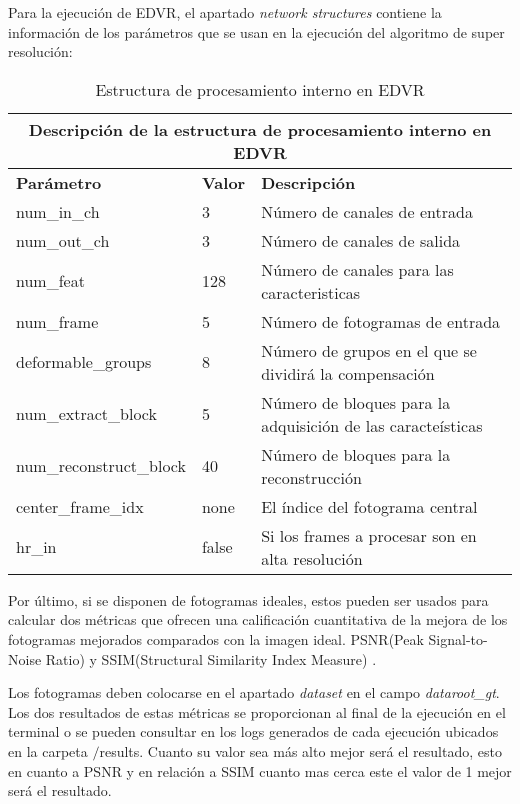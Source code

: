 Para la ejecución de EDVR, el apartado \emph{network structures} contiene la información de los parámetros que se usan en la ejecución del algoritmo de super resolución:

\begin{table}[h]
\begin{tabular}{ |p{5cm}||p{1cm}|p{6cm}|  }
 \hline
 \multicolumn{3}{|c|}{Descripción de la estructura de procesamiento interno en EDVR} \\
 \hline
 \textbf{Parámetro}&  \textbf{Valor}&  \textbf{Descripción} \\
 \hline
  \hline
            num\_in\_ch & 3 & Número de canales de entrada \\ \hline
		    num\_out\_ch & 3 & Número de canales de salida\\ \hline
		    num\_feat & 128 & Número de canales para las caracteristicas\\ \hline
		    num\_frame & 5 & Número de fotogramas de entrada\\ \hline
		    deformable\_groups & 8 & Número de grupos en el que se dividirá la compensación\\ \hline
		    num\_extract\_block & 5 & Número de bloques para la adquisición de las caracteísticas \\ \hline
		    num\_reconstruct\_block & 40 & Número de bloques para la reconstrucción\\ \hline
		    center\_frame\_idx & none & El índice del fotograma central\\ \hline
		    hr\_in & false & Si los frames a procesar son en alta resolución\\ \hline
\hline
\end{tabular}
\caption{Estructura de procesamiento interno en EDVR}
\end{table}

Por último, si se disponen de fotogramas ideales, estos pueden ser usados para calcular dos métricas que ofrecen una calificación cuantitativa de la mejora de los fotogramas mejorados comparados con la imagen ideal. PSNR(Peak Signal-to-Noise Ratio) \cite{wiki:PSNR} y SSIM(Structural Similarity Index Measure) \cite{ wiki:SSIM}. 

Los fotogramas deben colocarse en el apartado \emph{dataset} en el campo \emph{dataroot\_gt}. Los dos resultados de estas métricas se proporcionan al final de la ejecución en el terminal o se pueden consultar en los logs generados de cada ejecución ubicados en la carpeta $/$results. Cuanto su valor sea más alto mejor será el resultado, esto en cuanto a PSNR y en relación a SSIM cuanto mas cerca este el valor de 1 mejor será el resultado.


